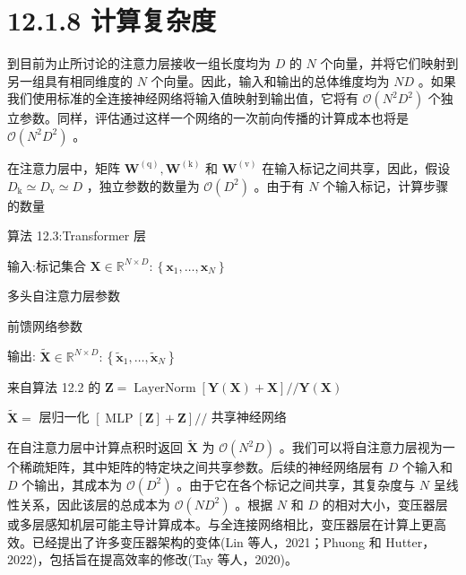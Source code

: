 \documentclass[10pt]{report}
\begin{document}
\section*{12.1.8 计算复杂度}

到目前为止所讨论的注意力层接收一组长度均为 \(D\) 的 \(N\) 个向量，并将它们映射到另一组具有相同维度的 \(N\) 个向量。因此，输入和输出的总体维度均为 \({ND}\) 。如果我们使用标准的全连接神经网络将输入值映射到输出值，它将有 \(\mathcal{O}\left( {{N}^{2}{D}^{2}}\right)\) 个独立参数。同样，评估通过这样一个网络的一次前向传播的计算成本也将是 \(\mathcal{O}\left( {{N}^{2}{D}^{2}}\right)\) 。

在注意力层中，矩阵 \({\mathbf{W}}^{\left( \mathrm{q}\right) },{\mathbf{W}}^{\left( \mathrm{k}\right) }\) 和 \({\mathbf{W}}^{\left( \mathrm{v}\right) }\) 在输入标记之间共享，因此，假设 \({D}_{\mathrm{k}} \simeq  {D}_{\mathrm{v}} \simeq  D\) ，独立参数的数量为 \(\mathcal{O}\left( {D}^{2}\right)\) 。由于有 \(N\) 个输入标记，计算步骤的数量

算法 12.3:Transformer 层

输入:标记集合 \(\mathbf{X} \in  {\mathbb{R}}^{N \times  D} : \left\{  {{\mathbf{x}}_{1},\ldots ,{\mathbf{x}}_{N}}\right\}\)

多头自注意力层参数

前馈网络参数

输出: \(\widetilde{\mathbf{X}} \in  {\mathbb{R}}^{N \times  D} : \left\{  {{\widetilde{\mathbf{x}}}_{1},\ldots ,{\widetilde{\mathbf{x}}}_{N}}\right\}\)

来自算法 12.2 的 \(\mathbf{Z} = \operatorname{LayerNorm}\left\lbrack  {\mathbf{Y}\left( \mathbf{X}\right)  + \mathbf{X}}\right\rbrack  //\mathbf{Y}\left( \mathbf{X}\right)\)

\(\widetilde{\mathbf{X}} =\) 层归一化 \(\left\lbrack  {\operatorname{MLP}\left\lbrack  \mathbf{Z}\right\rbrack   + \mathbf{Z}}\right\rbrack  //\) 共享神经网络

在自注意力层中计算点积时返回 \(\widetilde{\mathbf{X}}\) 为 \(\mathcal{O}\left( {{N}^{2}D}\right)\) 。我们可以将自注意力层视为一个稀疏矩阵，其中矩阵的特定块之间共享参数。后续的神经网络层有 \(D\) 个输入和 \(D\) 个输出，其成本为 \(\mathcal{O}\left( {D}^{2}\right)\) 。由于它在各个标记之间共享，其复杂度与 \(N\) 呈线性关系，因此该层的总成本为 \(\mathcal{O}\left( {N{D}^{2}}\right)\) 。根据 \(N\) 和 \(D\) 的相对大小，变压器层或多层感知机层可能主导计算成本。与全连接网络相比，变压器层在计算上更高效。已经提出了许多变压器架构的变体(Lin 等人，2021；Phuong 和 Hutter，2022)，包括旨在提高效率的修改(Tay 等人，2020)。
\end{document}
